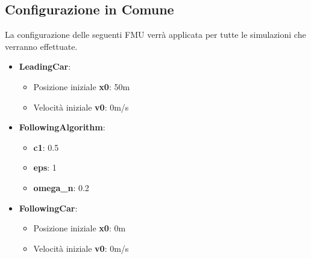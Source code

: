 \subsection{Configurazione in Comune}
La configurazione delle seguenti FMU verrà applicata per tutte le simulazioni che verranno effettuate.
\begin{itemize}
	\item \textbf{LeadingCar}:
	\begin{itemize}
		\item Posizione iniziale \textbf{x0}: 50m
		\item Velocità iniziale \textbf{v0}: 0m/s
	\end{itemize}
	
	\item \textbf{FollowingAlgorithm}:
	\begin{itemize}
		\item \textbf{c1}: 0.5
		\item \textbf{eps}: 1
		\item \textbf{omega\_n}: 0.2
	\end{itemize}
	
	
	\item \textbf{FollowingCar}:
	\begin{itemize}
		\item Posizione iniziale \textbf{x0}: 0m
		\item Velocità iniziale \textbf{v0}: 0m/s
	\end{itemize}
\end{itemize}

